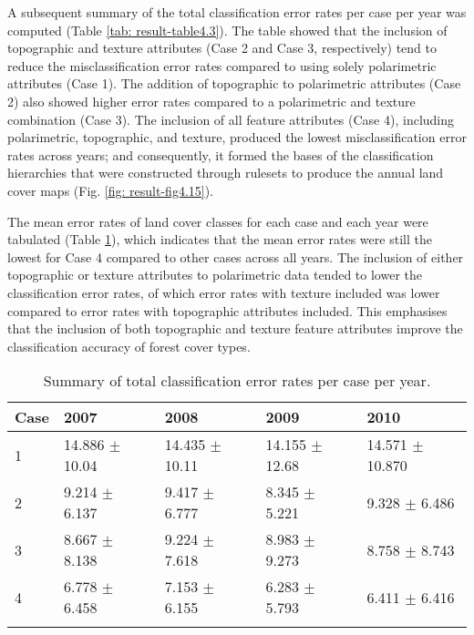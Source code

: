 A subsequent summary of the total classification error rates per case per year was computed (Table \ref{tab: result-table4.3}). The table showed that the inclusion of topographic and texture attributes (Case 2 and Case 3, respectively) tend to reduce the misclassification error rates compared to using solely polarimetric attributes (Case 1). The addition of topographic to polarimetric attributes (Case 2) also showed higher error rates compared to a polarimetric and texture combination (Case 3). The inclusion of all feature attributes (Case 4), including polarimetric, topographic, and texture, produced the lowest misclassification error rates across years; and consequently, it formed the bases of the classification hierarchies that were constructed through rulesets to produce the annual land cover maps (Fig. \ref{fig: result-fig4.15}).

The mean error rates of land cover classes for each case and each year were tabulated (Table \ref{tab: result-table4.4}), which indicates that the mean error rates were still the lowest for Case 4 compared to other cases across all years. The inclusion of either topographic or texture attributes to polarimetric data tended to lower the classification error rates, of which error rates with texture included was lower compared to error rates with topographic attributes included. This emphasises that the inclusion of both topographic and texture feature attributes improve the classification accuracy of forest cover types.\\

\begin{spacing}{1.0}
\begin{longtable}[h!]{ p{2cm} p{2.7cm} p{2.7cm} p{2.7cm} p{2.9cm} }

    \caption[Summary of total classification error rates per case per year.]{Summary of total classification error rates per case per year.}
    \label{tab: result-table4.4}\\
    
    	\toprule
    	Case & 2007 & 2008 & 2009 & 2010\\
    	\midrule
    	\endhead
    	
		1 & 14.886 $\pm$ 10.04 & 14.435 $\pm$ 10.11 & 14.155 $\pm$ 12.68 & 14.571 $\pm$ 10.870\\
		2 &  9.214 $\pm$ 6.137 &  9.417 $\pm$ 6.777 &  8.345 $\pm$ 5.221 &  9.328 $\pm$ 6.486\\
		3 &  8.667 $\pm$ 8.138 &  9.224 $\pm$ 7.618 &  8.983 $\pm$ 9.273 &  8.758 $\pm$ 8.743\\
		4 &  6.778 $\pm$ 6.458 &  7.153 $\pm$ 6.155 &  6.283 $\pm$ 5.793 &  6.411 $\pm$ 6.416\\
		
		\bottomrule \\
    
\end{longtable}
\end{spacing}

